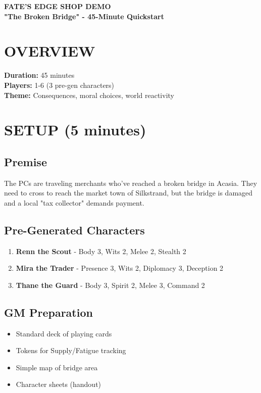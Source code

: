 \documentclass[11pt]{article}
\begin{document}
\newcommand{\dice}[1]{\texttt{#1}}
\newcommand{\dv}[1]{\textbf{DV #1}}
\newcommand{\cp}[1]{\textbf{CP: #1}}

\begin{center}
{\LARGE \textbf{FATE'S EDGE SHOP DEMO}} \\
{\large \textbf{"The Broken Bridge" - 45-Minute Quickstart}}
\end{center}

\section*{OVERVIEW}

\textbf{Duration:} 45 minutes \\
\textbf{Players:} 1-6 (3 pre-gen characters) \\
\textbf{Theme:} Consequences, moral choices, world reactivity

\section{SETUP (5 minutes)}

\subsection*{Premise}
The PCs are traveling merchants who've reached a broken bridge in Acasia. They need to cross to reach the market town of Silkstrand, but the bridge is damaged and a local "tax collector" demands payment.

\subsection*{Pre-Generated Characters}
\begin{enumerate}
\item \textbf{Renn the Scout} - Body 3, Wits 2, Melee 2, Stealth 2
\item \textbf{Mira the Trader} - Presence 3, Wits 2, Diplomacy 3, Deception 2
\item \textbf{Thane the Guard} - Body 3, Spirit 2, Melee 3, Command 2
\end{enumerate}

\subsection*{GM Preparation}
\begin{itemize}
\item Standard deck of playing cards
\item Tokens for Supply/Fatigue tracking
\item Simple map of bridge area
\item Character sheets (handout)
\end{itemize}
\end{document}
